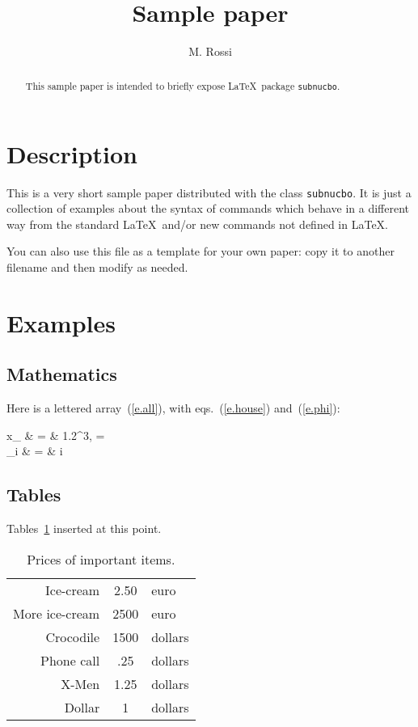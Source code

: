 \documentclass{subnucbo}
\title{Sample paper}
\author{M. Rossi}
\begin{document}
\maketitle

\begin{abstract}
This sample paper is intended to briefly expose \LaTeX\ package \texttt{subnucbo}. 
\end{abstract}

\section{Description}
This is a very short sample paper distributed with the class
\texttt{subnucbo}.
It is just a collection of examples about the syntax of commands
which behave in a different way from the standard \LaTeX\
and/or new commands not defined in \LaTeX.


You can also use this file as a template for your own paper:
copy it to another filename and then modify as needed.

\section{Examples}


\subsection{Mathematics}
Here is a lettered array~(\ref{e.all}), with eqs.~(\ref{e.house})
and~(\ref{e.phi}):
\begin{eqnletter}
 \label{e.all}
 \drm x_ & = & 1.2^3, \qquad
                      \sy{F} =     \label{e.house}\\
 \phi_i        & = & i\pi                                \label{e.phi}
\end{eqnletter}

\subsection{Tables}
Tables~\ref{tab:pricesI}
inserted at this point.

\begin{table}
  \caption{Prices of important items.}
  \label{tab:pricesI}
  \begin{tabular}{rcl}
    \hline
      Ice-cream      & 2.50  & euro    \\
      More ice-cream & 2500 & euro    \\
      Crocodile      & 1500  & dollars \\
    \hline
      Phone call     & .25   & dollars \\
      X-Men          & 1.25  & dollars \\
      Dollar         & 1     & dollars \\
    \hline
  \end{tabular}
\end{table}
\end{document}

